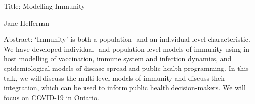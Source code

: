 
Title: Modelling Immunity

Jane Heffernan

Abstract: ‘Immunity’ is both a population- and an individual-level characteristic. We have developed individual- and population-level models of immunity using in-host modelling of vaccination, immune system and infection dynamics, and epidemiological models of disease spread and public health programming. In this talk, we will discuss the multi-level models of immunity and discuss their integration, which can be used to inform public health decision-makers. We will focus on COVID-19 in Ontario.


